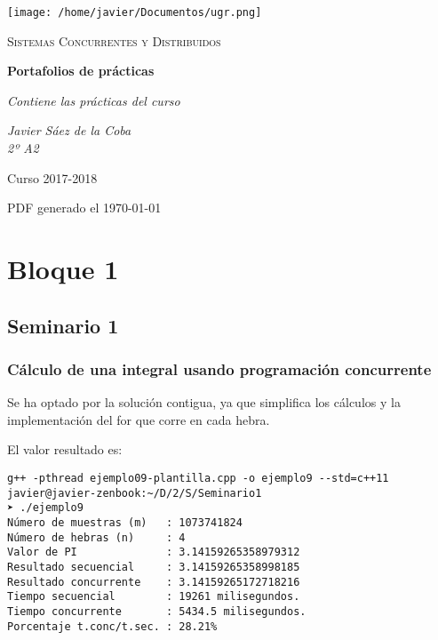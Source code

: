 \documentclass[12pt,a4paper]{article}
\begin{document}
\begin{titlepage}
  \centering
  \texttt{[image: /home/javier/Documentos/ugr.png]}\par\vspace{1cm}
  {\scshape\large Sistemas Concurrentes y Distribuidos \par} \vspace{1cm}
  {\huge\bfseries Portafolios de prácticas \par}
  \vspace{0.4cm}
  {\large\itshape Contiene las prácticas del curso\\}
  \vspace{0.6cm}
  {\large\itshape  Javier Sáez de la Coba \\ 2º A2 \par} \vspace{1.00cm}
  Curso 2017-2018 \\
  \vfill

  {\large PDF generado el \today\par}
\end{titlepage}

\tableofcontents
\newpage
\setlength{\parskip}{10pt}
\section{Bloque 1}
\subsection{Seminario 1}
\subsubsection{Cálculo de una integral usando programación concurrente}

Se ha optado por la solución contigua, ya que simplifica los cálculos y la implementación del for que corre en cada hebra.

El valor resultado es:
\begin{verbatim}
g++ -pthread ejemplo09-plantilla.cpp -o ejemplo9 --std=c++11 
javier@javier-zenbook:~/D/2/S/Seminario1                                        
➤ ./ejemplo9
Número de muestras (m)   : 1073741824
Número de hebras (n)     : 4
Valor de PI              : 3.14159265358979312
Resultado secuencial     : 3.14159265358998185
Resultado concurrente    : 3.14159265172718216
Tiempo secuencial        : 19261 milisegundos. 
Tiempo concurrente       : 5434.5 milisegundos. 
Porcentaje t.conc/t.sec. : 28.21%

	
\end{verbatim}
\end{document}
